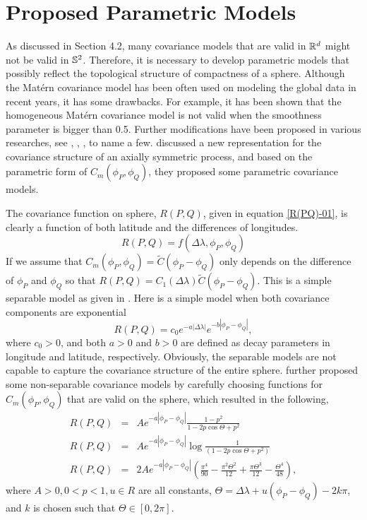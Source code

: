 				
			\section{Proposed Parametric Models}

As discussed in Section 4.2, many covariance models that are valid in $\mathbb{R}^d$ might not be valid in $\mathbb{S}^2$. Therefore, it is necessary to develop parametric models that possibly reflect the topological structure of compactness of a sphere. Although the Mat\'{e}rn covariance model has been often used on modeling the global data in recent years, it has some drawbacks. For example, it has been shown that the homogeneous Mat\'{e}rn covariance model is not valid when the smoothness parameter is bigger than 0.5. Further modifications have been proposed in various researches, see \cite{Li2013}, \cite{JunStein2008}, \cite{JeongJun2015}, to name a few. \cite{Huang2012} discussed a new representation for the covariance structure of an axially symmetric process, and based on the parametric form of $C_m(\phi_P, \phi_Q)$, they proposed some parametric covariance models.
					
The covariance function on sphere, $R(P,Q)$,  given in equation \ref{R(PQ)-01}, is clearly a function of both latitude and the differences of  longitudes.
			\[
				R(P,Q) = f(\Delta\lambda, \phi_P,\phi_Q)
			\]
If we assume that $C_m(\phi_P, \phi_Q) = \tilde{C}(\phi_P - \phi_Q)$ only depends on the difference of $\phi_P$ and $\phi_Q$ so that $R(P, Q) = C_1(\Delta \lambda)\tilde{C}(\phi_P - \phi_Q)$. This is a simple separable model as given in \cite{HuangZhangRobeson2011}. Here is a simple  model when both covariance components are exponential
			\[
				R(P, Q) = c_0e^{-a|\Delta \lambda|}e^{-b|\phi_P - \phi_Q|},
			\]
where $c_0 > 0$, and both $a>0$ and $b>0$ are defined as decay parameters in longitude and latitude, respectively. Obviously, the separable models are not capable to capture the covariance structure of the entire sphere. \cite{Huang2012} further proposed some non-separable covariance models by carefully choosing functions for $C_m(\phi_P, \phi_Q)$ that are valid on the sphere, which resulted in the following,
			\begin{eqnarray}
				R(P,Q) &=& Ae^{-a|\phi_P-\phi_Q|} \frac{1-p^2}{1-2p \cos\Theta+p^2} \label{model1} \\
				R(P,Q) &=& Ae^{-a|\phi_P-\phi_Q|} \log\frac{1}{(1-2p\cos\Theta + p^2)} \label{model2} \\
				R(P,Q) &=& 2Ae^{-a|\phi_P-\phi_Q|}\left(\frac{\pi^4}{90}-\frac{\pi^2\Theta^2}{12}+\frac{\pi\Theta^3}{12}-\frac{\Theta^4}{48}\right), \label{model3}
			\end{eqnarray}
where $A > 0, 0 < p < 1, u \in R$ are all constants, $\Theta = \Delta\lambda + u(\phi_P - \phi_Q) - 2k\pi$, and $k$ is chosen such that $\Theta \in [0,2\pi]$.
			
